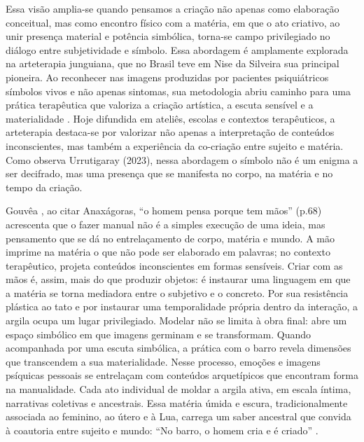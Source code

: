 Essa visão amplia-se quando pensamos a criação não apenas como elaboração conceitual, mas como encontro físico com a matéria, em que o ato criativo, ao unir presença material e potência simbólica, torna-se campo privilegiado no diálogo entre subjetividade e símbolo. Essa abordagem é amplamente explorada na arteterapia junguiana, que no Brasil teve em Nise da Silveira sua principal pioneira. Ao reconhecer nas imagens produzidas por pacientes psiquiátricos símbolos vivos e não apenas sintomas, sua metodologia abriu caminho para uma prática terapêutica que valoriza a criação artística, a escuta sensível e a materialidade \parencite{silveiraImagensInconsciente2015}. Hoje difundida em ateliês, escolas e contextos terapêuticos, a arteterapia destaca-se por valorizar não apenas a interpretação de conteúdos inconscientes, mas também a experiência da co-criação entre sujeito e matéria. Como observa Urrutigaray (2023), nessa abordagem o símbolo não é um enigma a ser decifrado, mas uma presença que se manifesta no corpo, na matéria e no tempo da criação.

Gouvêa \citeyear{gouveaSolTerraUso2021}, ao citar Anaxágoras, “o homem pensa porque tem mãos” (p.68) acrescenta que o fazer manual não é a simples execução de uma ideia, mas pensamento que se dá no entrelaçamento de corpo, matéria e mundo. A mão imprime na matéria o que não pode ser elaborado em palavras; no contexto terapêutico, projeta conteúdos inconscientes em formas sensíveis. Criar com as mãos é, assim, mais do que produzir objetos: é instaurar uma linguagem em que a matéria se torna mediadora entre o subjetivo e o concreto.
Por sua resistência plástica ao tato e por instaurar uma temporalidade própria dentro da interação, a argila ocupa um lugar privilegiado. Modelar não se limita à obra final: abre um espaço simbólico em que imagens germinam e se transformam. Quando acompanhada por uma escuta simbólica, a prática com o barro revela dimensões que transcendem a sua materialidade. Nesse processo, emoções e imagens psíquicas pessoais se entrelaçam com conteúdos arquetípicos que encontram forma na manualidade. Cada ato individual de moldar a argila ativa, em escala íntima, narrativas coletivas e ancestrais. Essa matéria úmida e escura, tradicionalmente associada ao feminino, ao útero e à Lua, carrega um saber ancestral que convida à coautoria entre sujeito e mundo: “No barro, o homem cria e é criado” \parencite[p.73]{gouveaSolTerraUso2021}.

